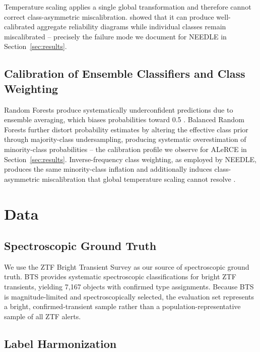 \documentclass[a4paper,fleqn,usenatbib]{mnras}
\begin{document}
Temperature scaling applies a single global transformation and
therefore cannot correct class-asymmetric miscalibration.
\citet{kull2019} showed that it can produce well-calibrated
aggregate reliability diagrams while individual classes remain
miscalibrated -- precisely the failure mode we document for NEEDLE
in Section~\ref{sec:results}.

\subsection{Calibration of Ensemble Classifiers and Class
Weighting}\label{sec:rfcalib}

Random Forests produce systematically underconfident predictions
due to ensemble averaging, which biases probabilities toward 0.5
\citep{niculescumizil2005, bostrom2008}. Balanced Random Forests
further distort probability estimates by altering the effective
class prior through majority-class undersampling, producing
systematic overestimation of minority-class probabilities
\citep{vandengoorbergh2022} -- the calibration profile we observe
for ALeRCE in Section~\ref{sec:results}. Inverse-frequency class
weighting, as employed by NEEDLE, produces the same minority-class
inflation and additionally induces class-asymmetric miscalibration
that global temperature scaling cannot resolve
\citep{vandengoorbergh2022, kull2019}.

\section{Data} \label{sec:data}

\subsection{Spectroscopic Ground Truth}\label{sec:groundtruth}

We use the ZTF Bright Transient Survey
\citep[BTS;][]{fremling2020, perley2020} as our source of
spectroscopic ground truth. BTS provides systematic spectroscopic
classifications for bright ZTF transients, yielding 7,167 objects
with confirmed type assignments. Because BTS is magnitude-limited
and spectroscopically selected, the evaluation set represents a
bright, confirmed-transient sample rather than a
population-representative sample of all ZTF alerts.

\subsection{Label Harmonization}\label{sec:labels}
\end{document}
